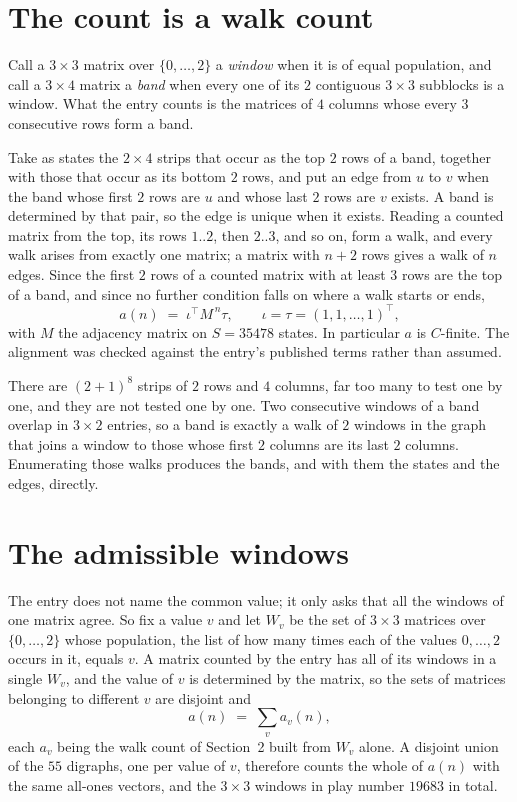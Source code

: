 \documentclass[11pt,a4paper]{article}
\theoremstyle{plain}
\theoremstyle{definition}
\begin{document}
\section{The count is a walk count}

Call a $3\times3$ matrix over $\{0,\dots,2\}$ a \emph{window} when it is of equal population, and
call a $3\times4$ matrix a \emph{band} when every one of its $2$ contiguous
$3\times3$ subblocks is a window. What the entry counts is the matrices of $4$ columns
whose every $3$ consecutive rows form a band.

Take as states the $2\times4$ strips that occur as the top $2$ rows of a band,
together with those that occur as its bottom $2$ rows, and put an edge from $u$ to $v$
when the band whose first $2$ rows are $u$ and whose last $2$ rows are $v$ exists.
A band is determined by that pair, so the edge is unique when it exists. Reading a counted
matrix from the top, its rows $1..2$, then $2..3$, and so on, form a walk, and every
walk arises from exactly one matrix; a matrix with $n+2$ rows gives a walk of $n$ edges.
Since the first $2$ rows of a counted matrix with at least $3$ rows are the top of a
band, and since no further condition falls on where a walk starts or ends,
\[
a(n)\;=\;\iota^{\!\top}M^{\,n}\tau ,\qquad \iota=\tau=(1,1,\dots,1)^{\!\top},
\]
with $M$ the adjacency matrix on $S=35478$ states. In particular $a$ is $C$-finite. The
alignment was checked against the entry's published terms rather than assumed.

There are $(2 + 1)^{8}$ strips of $2$ rows and $4$ columns, far too
many to test one by one, and they are not tested one by one. Two consecutive windows of a band
overlap in $3\times2$ entries, so a band is exactly a walk of $2$ windows in
the graph that joins a window to those whose first $2$ columns are its last $2$
columns. Enumerating those walks produces the bands, and with them the states and the edges,
directly.

\section{The admissible windows}

The entry does not name the common value; it only asks that all the windows of one matrix agree.
So fix a value $v$ and let $W_v$ be the set of $3\times3$ matrices over
$\{0,\dots,2\}$ whose population, the list of how many times each of the values $0,\dots,2$ occurs in it, equals $v$. A matrix counted by the entry has all of
its windows in a single $W_v$, and the value of $v$ is determined by the matrix, so the sets of
matrices belonging to different $v$ are disjoint and
\[
a(n)\;=\;\sum_v a_v(n),
\]
each $a_v$ being the walk count of Section~2 built from $W_v$ alone. A disjoint union of the
$55$ digraphs, one per value of $v$, therefore counts the whole of $a(n)$ with the same
all-ones vectors, and the $3\times3$ windows in play number $19683$ in total.
\end{document}
